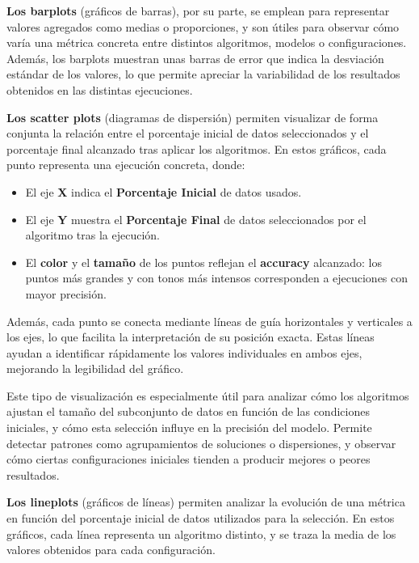 \textbf{Los barplots} (gráficos de barras), por su parte, se emplean para representar valores agregados como medias o proporciones,
y son útiles para observar cómo varía una métrica concreta entre distintos algoritmos, modelos o configuraciones.
Además, los barplots muestran unas barras de error que indica la desviación estándar de los valores,
lo que permite apreciar la variabilidad de los resultados obtenidos en las distintas ejecuciones.

\textbf{Los scatter plots} (diagramas de dispersión) permiten visualizar de forma conjunta la relación entre el
porcentaje inicial de datos seleccionados y el porcentaje final alcanzado tras aplicar los algoritmos.
En estos gráficos, cada punto representa una ejecución concreta, donde:

\begin{itemize}
    \item El eje \textbf{X} indica el \textbf{Porcentaje Inicial} de datos usados.
    \item El eje \textbf{Y} muestra el \textbf{Porcentaje Final} de datos seleccionados por el algoritmo tras la ejecución.
    \item El \textbf{color} y el \textbf{tamaño} de los puntos reflejan el \textbf{accuracy} alcanzado: los puntos más grandes
          y con tonos más intensos corresponden a ejecuciones con mayor precisión.
\end{itemize}

Además, cada punto se conecta mediante líneas de guía horizontales y verticales a los ejes, lo que facilita la interpretación de su posición exacta.
Estas líneas ayudan a identificar rápidamente los valores individuales en ambos ejes, mejorando la legibilidad del gráfico.

Este tipo de visualización es especialmente útil para analizar cómo los algoritmos ajustan el tamaño del subconjunto de datos en función de las condiciones iniciales,
y cómo esta selección influye en la precisión del modelo.
Permite detectar patrones como agrupamientos de soluciones o dispersiones, y observar cómo ciertas configuraciones iniciales tienden a producir mejores o peores resultados.

\textbf{Los lineplots} (gráficos de líneas) permiten analizar la evolución de una métrica en función del porcentaje inicial de datos utilizados para la selección.
En estos gráficos, cada línea representa un algoritmo distinto, y se traza la media de los valores obtenidos para cada configuración.

